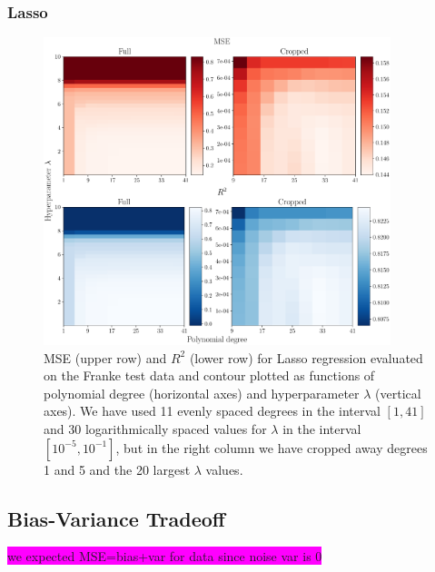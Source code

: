 \documentclass[aps,pra,english,notitlepage,reprint,nofootinbib]{revtex4-1}  %
\begin{document}
\subsubsection{Lasso}
\begin{figure}
  \vspace*{-5pt}
  \centering %
  \includegraphics[width=0.9\textwidth]{../figs/c_MSE_R2.pdf}
  \caption{MSE (upper row) and $R^2$ (lower row) for Lasso regression evaluated on the Franke test data and contour plotted as functions of polynomial degree (horizontal axes) and hyperparameter $\lambda$ (vertical axes). We have used 11 evenly spaced degrees in the interval $[1, 41]$ and 30 logarithmically spaced values for $\lambda$ in the interval $[10^{-5},10^{-1}]$, but in the right column we have cropped away degrees 1 and 5 and the 20 largest $\lambda$ values.}\label{fig:c MSE R2}
  \vspace*{-5pt}
\end{figure}


\subsection{Bias-Variance Tradeoff}
\colorbox{magenta}{we expected MSE=bias+var for data since noise var is 0}
\end{document}
